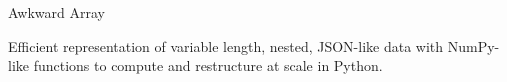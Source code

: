\documentclass[aspectratio=169]{beamer}
\begin{document}
\begin{frame}{Awkward Array}
\large
\vspace{0.25 cm}

Efficient representation of variable length, nested, JSON-like data with NumPy-like functions to compute and restructure at scale in Python.

\begin{columns}
\end{columns}
\end{frame}
\end{document}
